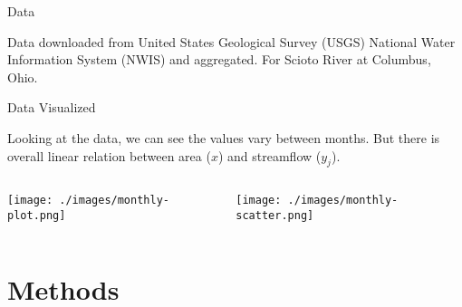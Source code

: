 \documentclass{beamer}
\begin{document}
\begin{frame}{Data}
\begin{adjustbox}{width=0.9\textwidth, totalheight=\baselineskip,keepaspectratio}
\end{adjustbox}

\vspace{0.5cm}

{
  \small
  \color{gray}
  Data downloaded from United States Geological Survey (USGS) National Water Information System (NWIS) and aggregated. For Scioto River at Columbus, Ohio.
}
\end{frame}

\begin{frame}{Data Visualized}

  Looking at the data, we can see the values vary between months. But there is overall linear relation between area (\(x\)) and streamflow (\(y_j\)).

  \begin{columns}
    \texttt{[image: ./images/monthly-plot.png]}
    
    \texttt{[image: ./images/monthly-scatter.png]}
    
  \end{columns}
  
\end{frame}

\section{Methods}
\end{document}
